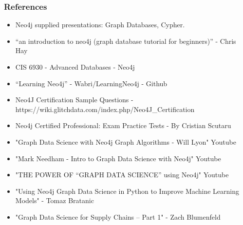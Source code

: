 
\begin{frame}\frametitle{References}
\begin{itemize}
\item Neo4j supplied presentations: Graph Databases, Cypher.
\item ``an introduction to neo4j (graph database tutorial for beginners)'' - Chris Hay
\item CIS 6930 - Advanced Databases - Neo4j 
\item ``Learning Neo4j'' - Wabri/LearningNeo4j - Github
\item Neo4J Certification Sample Questions - https://wiki.glitchdata.com/index.php/Neo4J\_Certification
\item Neo4j Certified Professional: Exam Practice Tests - By Cristian Scutaru
\item "Graph Data Science with Neo4j Graph Algorithms - Will Lyon" Youtube
\item "Mark Needham - Intro to Graph Data Science with Neo4j" Youtube
\item "THE POWER OF “GRAPH DATA SCIENCE” using Neo4j" Youtube
\item "Using Neo4j Graph Data Science in Python to Improve Machine Learning Models" - Tomaz Bratanic 
\item "Graph Data Science for Supply Chains – Part 1" - Zach Blumenfeld
\end{itemize}
\end{frame}